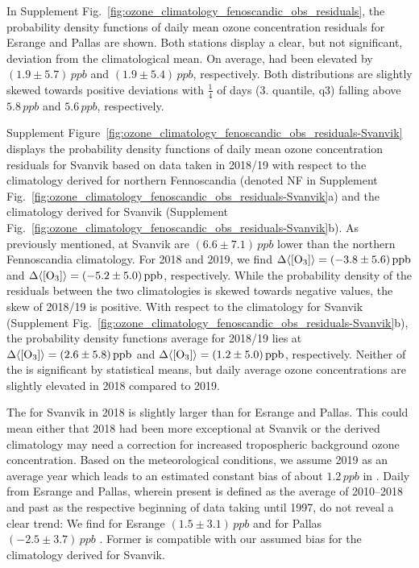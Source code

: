 \documentclass[bg, manuscript]{copernicus}
\begin{document}
In Supplement Fig.~\ref{fig:ozone_climatology_fenoscandic_obs_residuals}, the probability density functions of daily mean ozone concentration residuals for Esrange and Pallas are shown. Both stations display a clear, but not significant, deviation from the climatological mean. On average, \chem{[O_3]} had been elevated by $(1.9\pm 5.7)\,\unit{ppb}$ and $(1.9\pm 5.4)\,\unit{ppb}$, respectively. Both distributions are slightly skewed towards positive deviations with $\frac{1}{4}$ of days (3. quantile, q3) falling above $5.8\,\unit{ppb}$ and $5.6\,\unit{ppb}$, respectively.

Supplement Figure~\ref{fig:ozone_climatology_fenoscandic_obs_residuals-Svanvik} displays the probability density functions of daily mean ozone concentration residuals for Svanvik based on data taken in 2018/19 with respect to the climatology derived for northern Fennoscandia (denoted NF in Supplement Fig.~\ref{fig:ozone_climatology_fenoscandic_obs_residuals-Svanvik}a) and the climatology derived for Svanvik (Supplement Fig.~\ref{fig:ozone_climatology_fenoscandic_obs_residuals-Svanvik}b).
As previously mentioned, \chem{\left<[O_3]\right>} at Svanvik are $(6.6\pm 7.1)\,\unit{ppb}$ lower than the northern Fennoscandia climatology. For 2018 and 2019, we find $\Delta\chem{\left<[O_3]\right>} = (-3.8\pm 5.6)\,\unit{ppb}$ and $\Delta\chem{\left<[O_3]\right>} = (-5.2\pm 5.0)\,\unit{ppb}$, respectively. While the probability density of the residuals between the two climatologies is skewed towards negative values, the skew of 2018/19 is positive.
With respect to the climatology for Svanvik (Supplement Fig.~\ref{fig:ozone_climatology_fenoscandic_obs_residuals-Svanvik}b), the probability density functions average for 2018/19 lies at $\Delta\chem{\left<[O_3]\right>} = (2.6\pm 5.8)\,\unit{ppb}$ and $\Delta\chem{\left<[O_3]\right>} = (1.2\pm 5.0)\,\unit{ppb}$, respectively.
Neither of the \chem{\Delta\left<[O_3]\right>} is significant by statistical means, but daily average ozone concentrations are slightly elevated in 2018 compared to 2019.

The \chem{\left<\Delta\left<[O_3]\right>\right>} for Svanvik in 2018 is slightly larger than for Esrange and Pallas. This could mean either that 2018 had been more exceptional at Svanvik or the derived climatology may need a correction for increased tropospheric background ozone concentration. Based on the meteorological conditions, we assume 2019 as an average year which leads to an estimated constant bias of about $1.2\,\unit{ppb}$ in \chem{[O_3]}. Daily  from Esrange and Pallas, wherein present is defined as the average of 2010--2018 and past as the respective beginning of data taking until 1997, do not reveal a clear trend: We find for Esrange $(1.5\pm 3.1)\,\unit{ppb}$ and for Pallas $(-2.5\pm 3.7)\,\unit{ppb}$ \citep{NILU2003, BER:Ruoho-Airola2015}. Former is compatible with our assumed bias for the climatology derived for Svanvik.
\end{document}
